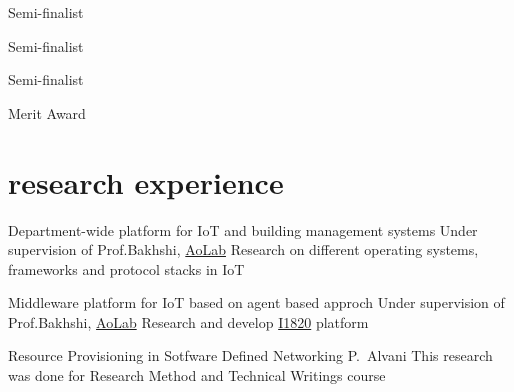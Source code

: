 \documentclass[]{friggeri-cv} %
\begin{document}
\begin{entrylist}
	{}
	{}
	{}


	{\textcolor{TextOrange}{Semi-finalist} }
	{}
	{}


	{\textcolor{TextOrange}{Semi-finalist} }
	{}
	{}


	{\textcolor{TextOrange}{Semi-finalist} }
	{}
	{}


	{ \textcolor{Ocean}{Merit Award} }
	{}
	{}


	{}
	{}
	{}


\end{entrylist}
\pagebreak


\section{research experience}

\begin{entrylist}

	{Department-wide platform for IoT and building management systems}
	{Under supervision of Prof.Bakhshi, \href{https://aolab.github.io/}{AoLab}}
	{Research on different operating systems, frameworks and protocol stacks in IoT}
	
	{Middleware platform for IoT based on agent based approch}
	{Under supervision of Prof.Bakhshi, \href{https://aolab.github.io/}{AoLab}}
	{Research and develop \href{https://github.com/aolab/I1820}{I1820} platform}

	{Resource Provisioning in Sotfware Defined Networking}
	{P.\ Alvani}
	{This research was done for Research Method and Technical Writings course}

\end{entrylist}
\end{document}

